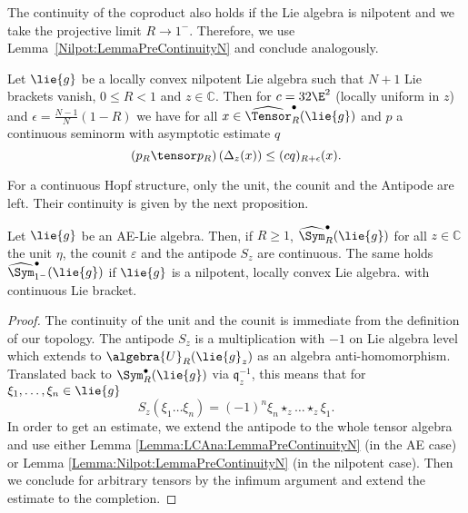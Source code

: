 %

The continuity of the coproduct also holds if the Lie algebra is nilpotent 
and we take the projective limit $R \longrightarrow 1^-$. Therefore, we use 
Lemma~\ref{Nilpot:LemmaPreContinuityN} and conclude analogously.
\begin{proposition}
    \label{Thm:Hopf:CoproductContinuity2}%
    Let $\lie{g}$ be a locally convex nilpotent Lie algebra such that $N + 1$ 
    Lie brackets vanish, $0 \leq R < 1$ and $z \in \mathbb{C}$. Then for $c = 
    32 \E^2$ (locally uniform in $z$) and 
    $\epsilon = \frac{N - 1}{N}(1 - R)$ we have for all $x \in 
    \widehat{\Tensor}_R^\bullet(\lie{g})$ and $p$ a continuous seminorm with 
    asymptotic estimate $q$
    \begin{equation}\label{Hopf:CoproductContinuity2}
        (p_R \tensor p_R) \left(
        \ocoproduct_z (x) \right)
        \leq
        (c q)_{R + \epsilon} (x).
    \end{equation}
\end{proposition}

%


For a continuous Hopf structure, only the unit, the counit and the Antipode are 
left. Their continuity is given by the next proposition.
\begin{proposition}
    \label{Prop:Hopf:ContinuousHopf}%
    Let $\lie{g}$ be an AE-Lie algebra. Then, if $R \geq 1$,
    $\widehat{\Sym}_R^\bullet (\lie{g})$ for all $z \in \mathbb{C}$ 
    the unit $\eta$, the counit $\varepsilon$ and the antipode $S_z$ are 
    continuous. The same holds $\widehat{\Sym}_{1^-}^\bullet(\lie{g})$ if 
    $\lie{g}$ is a nilpotent, locally convex Lie algebra. with continuous Lie 
    bracket.
\end{proposition}
\begin{proof}
    The continuity of the unit and the counit is immediate
    from the definition of our topology. The antipode $S_z$
    is a multiplication with $-1$ on Lie algebra level which extends to
    $\algebra{U}_R(\lie{g}_z)$ as an algebra anti-homomorphism. Translated
    back to $\Sym_R^\bullet(\lie{g})$ via $\mathfrak{q}_z^{-1}$, this means 
    that for $\xi_1, \ldots, \xi_n \in \lie{g}$
    \begin{equation*}
    	S_z\left(
    		\xi_1 \ldots \xi_n
    	\right)
    	=
    	(-1)^n \xi_n \star_z \ldots \star_z \xi_1.
    \end{equation*}
    In order to get an estimate, we extend the antipode to the whole
    tensor algebra and use either Lemma \ref{Lemma:LCAna:LemmaPreContinuityN}
    (in the AE case) or Lemma \ref{Lemma:Nilpot:LemmaPreContinuityN} (in the
    nilpotent case). Then we conclude for arbitrary tensors by the
    infimum argument and extend the estimate to the completion.
\end{proof}


